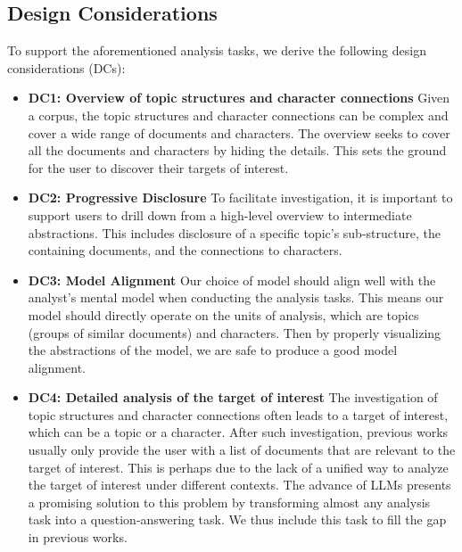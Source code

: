 \subsection{Design Considerations}
To support the aforementioned analysis tasks, we derive the following design considerations (DCs):
\begin{itemize}
  \item \textbf{DC1: Overview of topic structures and character connections}
  Given a corpus, the topic structures and character connections can be complex and cover a wide range of documents and characters. 
  The overview seeks to cover all the documents and characters by hiding the details.
  This sets the ground for the user to discover their targets of interest.
  \item \textbf{DC2: Progressive Disclosure}
  To facilitate investigation, it is important to support users to drill down from a high-level overview to intermediate abstractions.
  This includes disclosure of a specific topic's sub-structure, the containing documents, and the connections to characters.
  \item \textbf{DC3: Model Alignment}
  Our choice of model should align well with the analyst's mental model when conducting the analysis tasks.
  This means our model should directly operate on the units of analysis, which are topics (groups of similar documents) and characters.
  Then by properly visualizing the abstractions of the model, we are safe to produce a good model alignment.
  \item \textbf{DC4: Detailed analysis of the target of interest}
  The investigation of topic structures and character connections often leads to a target of interest, which can be a topic or a character.
  After such investigation, previous works usually only provide the user with a list of documents that are relevant to the target of interest.
  This is perhaps due to the lack of a unified way to analyze the target of interest under different contexts.
  The advance of LLMs presents a promising solution to this problem by transforming almost any analysis task into a question-answering task.
  We thus include this task to fill the gap in previous works.
\end{itemize}


